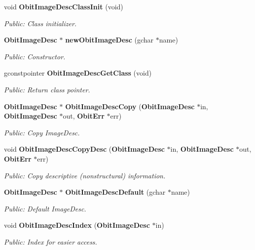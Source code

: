 \begin{CompactItemize}
\item 
void {\bf Obit\-Image\-Desc\-Class\-Init} (void)
\begin{CompactList}\small\item\em Public: Class initializer. \item\end{CompactList}\item 
{\bf Obit\-Image\-Desc} $\ast$ {\bf new\-Obit\-Image\-Desc} (gchar $\ast$name)
\begin{CompactList}\small\item\em Public: Constructor. \item\end{CompactList}\item 
gconstpointer {\bf Obit\-Image\-Desc\-Get\-Class} (void)
\begin{CompactList}\small\item\em Public: Return class pointer. \item\end{CompactList}\item 
{\bf Obit\-Image\-Desc} $\ast$ {\bf Obit\-Image\-Desc\-Copy} ({\bf Obit\-Image\-Desc} $\ast$in, {\bf Obit\-Image\-Desc} $\ast$out, {\bf Obit\-Err} $\ast$err)
\begin{CompactList}\small\item\em Public: Copy Image\-Desc. \item\end{CompactList}\item 
void {\bf Obit\-Image\-Desc\-Copy\-Desc} ({\bf Obit\-Image\-Desc} $\ast$in, {\bf Obit\-Image\-Desc} $\ast$out, {\bf Obit\-Err} $\ast$err)
\begin{CompactList}\small\item\em Public: Copy descriptive (nonstructural) information. \item\end{CompactList}\item 
{\bf Obit\-Image\-Desc} $\ast$ {\bf Obit\-Image\-Desc\-Default} (gchar $\ast$name)
\begin{CompactList}\small\item\em Public: Default Image\-Desc. \item\end{CompactList}\item 
void {\bf Obit\-Image\-Desc\-Index} ({\bf Obit\-Image\-Desc} $\ast$in)
\begin{CompactList}\small\item\em Public: Index for easier access. \item\end{CompactList}\item 

\end{CompactItemize}
